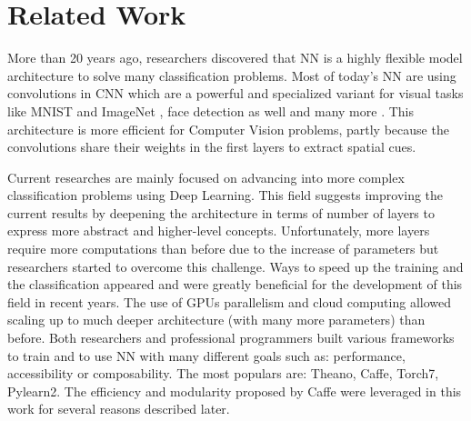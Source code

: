 \documentclass[a4paper,12pt]{report}
\begin{document}
\chapter{Related Work}
\label{chap:related}

More than 20 years ago, researchers discovered that NN is a highly flexible model architecture to solve many classification problems.
Most of today's NN are using convolutions in CNN which are a powerful and specialized variant for visual tasks like MNIST \cite{mnist_web} and ImageNet \cite{krizhevsky2012imagenet}, face detection as well \cite{rowley1998neural} and many more \cite{prechelt1994proben1}.
This architecture is more efficient for Computer Vision problems, partly because the convolutions share their weights in the first layers to extract spatial cues.

Current researches are mainly focused on advancing into more complex classification problems using Deep Learning.
This field suggests improving the current results by deepening the architecture in terms of number of layers to express more abstract and higher-level concepts.
Unfortunately, more layers require more computations than before due to the increase of parameters but researchers started to overcome this challenge.
Ways to speed up the training and the classification appeared and were greatly beneficial for the development of this field in recent years\cite{ciresan2011flexible}\cite{schmidhuber2015deep}\cite{nasse2009face}.
The use of GPUs parallelism and cloud computing allowed scaling up to much deeper architecture (with many more parameters) than before\cite{coates2013deep}.
Both researchers and professional programmers built various frameworks to train and to use NN with many different goals such as: performance, accessibility or composability.
The most populars are: Theano\cite{bastien2012theano}, Caffe\cite{jia2014caffe}, Torch7\cite{collobert2011torch7}, Pylearn2\cite{goodfellow2013pylearn2}.
The efficiency and modularity proposed by Caffe were leveraged in this work for several reasons described later.
\end{document}
